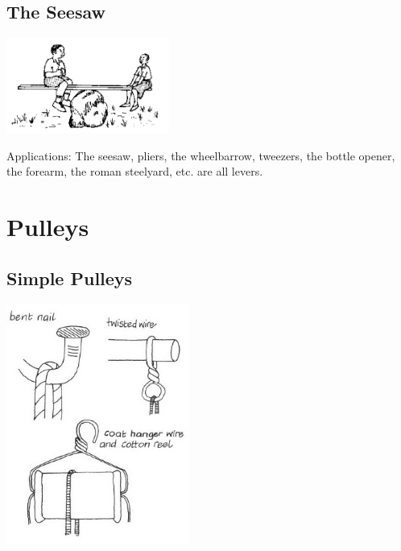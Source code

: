 \begin{multicols}{2}
\subsection{The Seesaw}

\begin{center}
\includegraphics[width=0.4\textwidth]{./img/source/mechanics.png}
\end{center}

\begin{description*}
\item[Applications:]{The seesaw, pliers, the wheelbarrow, tweezers, the bottle opener, the forearm, the roman
steelyard, etc. are all levers.}
\end{description*}

\columnbreak


\section*{Pulleys} 


\subsection{Simple Pulleys}
\label{sub:pulleys}

\begin{center}
\includegraphics[width=0.45\textwidth]{./img/vso/pulleys.jpg}
\end{center}


\end{multicols}
